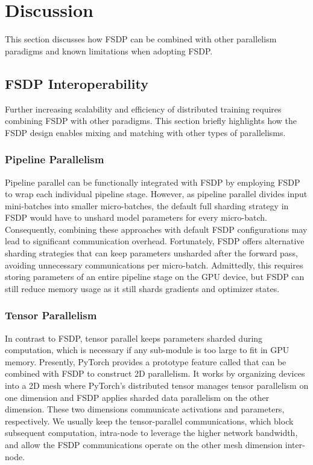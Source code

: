 \section{Discussion}\label{sec:discussion}

This section discusses how FSDP can be combined with other parallelism paradigms and known limitations when adopting FSDP. 

\subsection{FSDP Interoperability}

Further increasing scalability and efficiency of distributed training requires combining FSDP with other paradigms. This section briefly highlights how the FSDP design enables mixing and matching with other types of parallelisms.


\subsubsection{Pipeline Parallelism} \hfill \break

Pipeline parallel can be functionally integrated with FSDP by employing FSDP to wrap each individual pipeline stage. However, as pipeline parallel divides input mini-batches into smaller micro-batches, the default full sharding strategy in FSDP would have to unshard model parameters for every micro-batch. Consequently, combining these approaches with default FSDP configurations may lead to significant communication overhead. Fortunately, FSDP offers alternative sharding strategies that can keep parameters unsharded after the forward pass, avoiding unnecessary  communications per micro-batch. Admittedly, this requires storing parameters of an entire pipeline stage on the GPU device, but FSDP can still reduce memory usage as it still shards gradients and optimizer states.

\subsubsection{Tensor Parallelism} \hfill \break

In contrast to FSDP, tensor parallel keeps parameters sharded during computation, which is necessary if any sub-module is too large to fit in GPU memory. Presently, PyTorch provides a prototype feature called  that can be combined with FSDP to construct 2D parallelism. It works by organizing devices into a 2D mesh where PyTorch's distributed tensor  manages tensor parallelism on one dimension and FSDP applies sharded data parallelism on the other dimension. These two dimensions communicate activations and parameters, respectively. We usually keep the tensor-parallel communications, which block subsequent computation, intra-node to leverage the higher network bandwidth, and allow the FSDP communications operate on the other mesh dimension inter-node.


